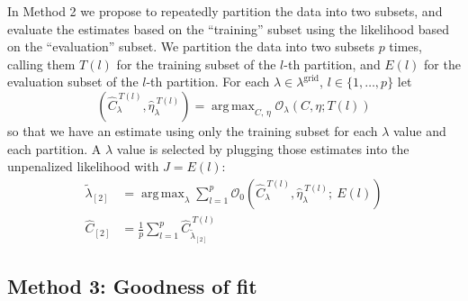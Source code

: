 \documentclass[oupdraft]{bio}
\DeclareMathOperator*{\argmax}{arg\,max}
\newcommand{\lambdagrid}{\lambda^{\text{grid}}}
\begin{document}
In Method 2 we propose to repeatedly partition the data into two subsets, and evaluate the estimates based on the ``training'' subset using the likelihood based on the ``evaluation'' subset.
We partition the data into two subsets $p$ times, calling them $T(l)$ for the training subset of the $l$-th partition, and $E(l)$ for the evaluation subset of the $l$-th partition. For each $\lambda \in \lambdagrid$, $l \in \{1, \dots , p\}$ let
\begin{equation}
\left(\widehat{C}_{\lambda}^{ \ T(l)}, \widehat{\eta}_{\lambda}^{ \ T(l)} \right) = \argmax_{C, \, \eta} \mathcal{O}_\lambda \left(C, \eta; T(l) \right) \label{eq:part_c_hats_method_2}
\end{equation}
so that we have an estimate using only the training subset for each $\lambda$ value and each partition.  A $\lambda$ value is selected by plugging those estimates into the unpenalized likelihood with $J = E(l)$:
\begin{align}
\widetilde{\lambda}_{[2]} &= \argmax_\lambda \sum_{l=1}^p \mathcal{O}_0\left( \widehat{C}_{\lambda}^{ \ T(l)}, \widehat{\eta}_{\lambda}^{ \ T(l)} ; \  E(l) \right) \label{eq:selected_lambda_2} \\
\widehat{C}_{[2]} &= \frac{1}{p} \sum_{l=1}^p \widehat{C}_{\widetilde{\lambda}_{[2]}}^{ \ T(l)}
\end{align}


%
%
%
\subsection{Method 3: Goodness of fit}
\end{document}
